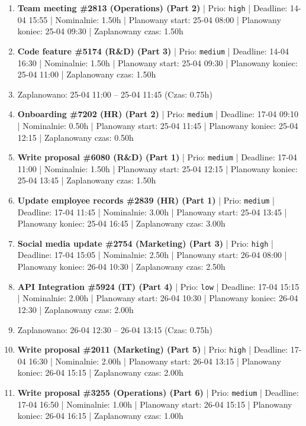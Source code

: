 {\begin{enumerate}
  \item [\textbf{14617}] \textbf{Team meeting \#2813 (Operations) (Part 2)} | Prio: \texttt{high} | Deadline: 14-04 15:55 | Nominalnie: 1.50h | Planowany start: 25-04 08:00 | Planowany koniec: 25-04 09:30 | Zaplanowany czas: 1.50h
  \item [\textbf{14646}] \textbf{Code feature \#5174 (R\&D) (Part 3)} | Prio: \texttt{medium} | Deadline: 14-04 16:30 | Nominalnie: 1.50h | Planowany start: 25-04 09:30 | Planowany koniec: 25-04 11:00 | Zaplanowany czas: 1.50h
  \item [\textbf{PRZERWA}] Zaplanowano: 25-04 11:00 -- 25-04 11:45 (Czas: 0.75h)
  \item [\textbf{14648}] \textbf{Onboarding \#7202 (HR) (Part 2)} | Prio: \texttt{medium} | Deadline: 17-04 09:10 | Nominalnie: 0.50h | Planowany start: 25-04 11:45 | Planowany koniec: 25-04 12:15 | Zaplanowany czas: 0.50h
  \item [\textbf{14669}] \textbf{Write proposal \#6080 (R\&D) (Part 1)} | Prio: \texttt{medium} | Deadline: 17-04 11:00 | Nominalnie: 1.50h | Planowany start: 25-04 12:15 | Planowany koniec: 25-04 13:45 | Zaplanowany czas: 1.50h
  \item [\textbf{14670}] \textbf{Update employee records \#2839 (HR) (Part 1)} | Prio: \texttt{medium} | Deadline: 17-04 11:45 | Nominalnie: 3.00h | Planowany start: 25-04 13:45 | Planowany koniec: 25-04 16:45 | Zaplanowany czas: 3.00h
  \item [\textbf{14611}] \textbf{Social media update \#2754 (Marketing) (Part 3)} | Prio: \texttt{high} | Deadline: 17-04 15:05 | Nominalnie: 2.50h | Planowany start: 26-04 08:00 | Planowany koniec: 26-04 10:30 | Zaplanowany czas: 2.50h
  \item [\textbf{14696}] \textbf{API Integration \#5924 (IT) (Part 4)} | Prio: \texttt{low} | Deadline: 17-04 15:15 | Nominalnie: 2.00h | Planowany start: 26-04 10:30 | Planowany koniec: 26-04 12:30 | Zaplanowany czas: 2.00h
  \item [\textbf{PRZERWA}] Zaplanowano: 26-04 12:30 -- 26-04 13:15 (Czas: 0.75h)
  \item [\textbf{14628}] \textbf{Write proposal \#2011 (Marketing) (Part 5)} | Prio: \texttt{high} | Deadline: 17-04 16:30 | Nominalnie: 2.00h | Planowany start: 26-04 13:15 | Planowany koniec: 26-04 15:15 | Zaplanowany czas: 2.00h
  \item [\textbf{14654}] \textbf{Write proposal \#3255 (Operations) (Part 6)} | Prio: \texttt{medium} | Deadline: 17-04 16:50 | Nominalnie: 1.00h | Planowany start: 26-04 15:15 | Planowany koniec: 26-04 16:15 | Zaplanowany czas: 1.00h

\end{enumerate}}

